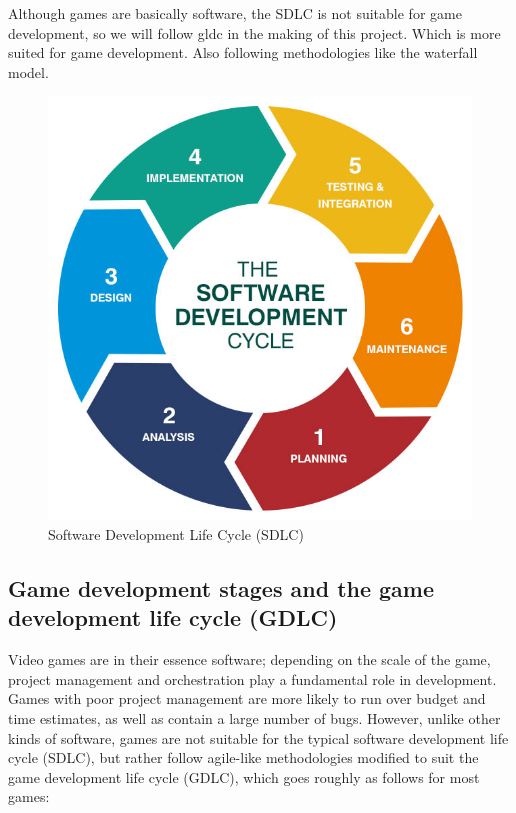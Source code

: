 \documentclass[../main.tex]{subfiles}
\begin{document}
Although games are basically software, the SDLC is not suitable for game development, so we will follow \acrfull{gldc} in the making of this project. Which is more suited for game development. Also following methodologies like the waterfall model. 

\begin{figure}[!ht]
\centering
\includegraphics[scale=0.3]{images/chapter3/SDLC.png}
\caption{Software Development Life Cycle (SDLC)}
\label{sdlc}
\end{figure}
\newpage
\subsection{Game development stages and the game development life cycle (GDLC)}
Video games are in their essence software; depending on the scale of the game, project management and orchestration play a fundamental role in development. Games with poor project management are more likely to run over budget and time estimates, as well as contain a large number of bugs. However, unlike other kinds of software, games are not suitable for the typical software development life cycle (SDLC), but rather follow agile-like methodologies modified to suit the game development life cycle (GDLC), which goes roughly as follows for most games:
\end{document}
